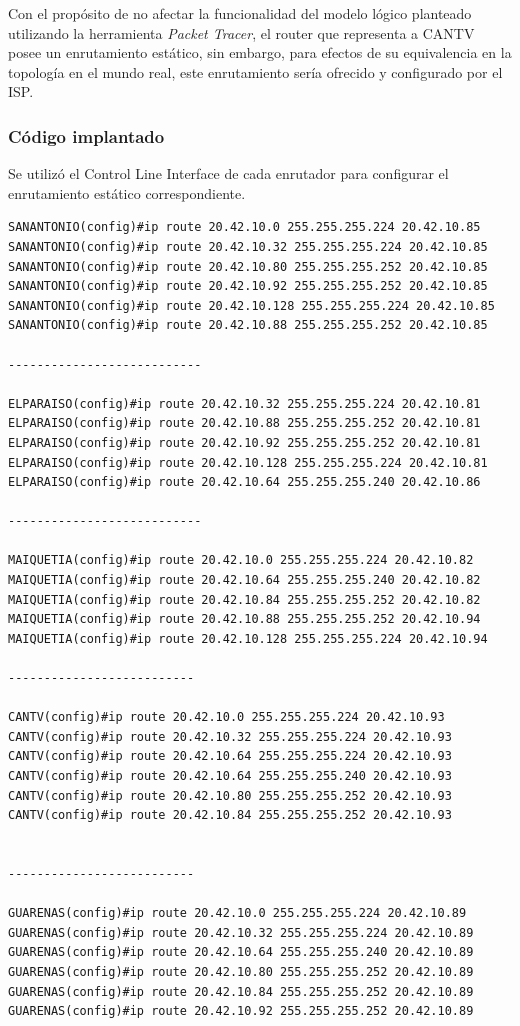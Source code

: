 \documentclass[]{article}
\begin{document}
Con el propósito de no afectar la funcionalidad del modelo lógico
planteado utilizando la herramienta \emph{Packet Tracer}, el router que
representa a CANTV posee un enrutamiento estático, sin embargo, para
efectos de su equivalencia en la topología en el mundo real, este
enrutamiento sería ofrecido y configurado por el ISP.

\subsubsection{Código implantado}\label{cuxf3digo-implantado}

Se utilizó el Control Line Interface de cada enrutador para configurar
el enrutamiento estático correspondiente.

\begin{verbatim}
SANANTONIO(config)#ip route 20.42.10.0 255.255.255.224 20.42.10.85
SANANTONIO(config)#ip route 20.42.10.32 255.255.255.224 20.42.10.85
SANANTONIO(config)#ip route 20.42.10.80 255.255.255.252 20.42.10.85
SANANTONIO(config)#ip route 20.42.10.92 255.255.255.252 20.42.10.85
SANANTONIO(config)#ip route 20.42.10.128 255.255.255.224 20.42.10.85
SANANTONIO(config)#ip route 20.42.10.88 255.255.255.252 20.42.10.85

---------------------------

ELPARAISO(config)#ip route 20.42.10.32 255.255.255.224 20.42.10.81
ELPARAISO(config)#ip route 20.42.10.88 255.255.255.252 20.42.10.81
ELPARAISO(config)#ip route 20.42.10.92 255.255.255.252 20.42.10.81
ELPARAISO(config)#ip route 20.42.10.128 255.255.255.224 20.42.10.81
ELPARAISO(config)#ip route 20.42.10.64 255.255.255.240 20.42.10.86

---------------------------

MAIQUETIA(config)#ip route 20.42.10.0 255.255.255.224 20.42.10.82
MAIQUETIA(config)#ip route 20.42.10.64 255.255.255.240 20.42.10.82
MAIQUETIA(config)#ip route 20.42.10.84 255.255.255.252 20.42.10.82
MAIQUETIA(config)#ip route 20.42.10.88 255.255.255.252 20.42.10.94
MAIQUETIA(config)#ip route 20.42.10.128 255.255.255.224 20.42.10.94

--------------------------

CANTV(config)#ip route 20.42.10.0 255.255.255.224 20.42.10.93
CANTV(config)#ip route 20.42.10.32 255.255.255.224 20.42.10.93
CANTV(config)#ip route 20.42.10.64 255.255.255.224 20.42.10.93
CANTV(config)#ip route 20.42.10.64 255.255.255.240 20.42.10.93
CANTV(config)#ip route 20.42.10.80 255.255.255.252 20.42.10.93
CANTV(config)#ip route 20.42.10.84 255.255.255.252 20.42.10.93


--------------------------

GUARENAS(config)#ip route 20.42.10.0 255.255.255.224 20.42.10.89
GUARENAS(config)#ip route 20.42.10.32 255.255.255.224 20.42.10.89
GUARENAS(config)#ip route 20.42.10.64 255.255.255.240 20.42.10.89
GUARENAS(config)#ip route 20.42.10.80 255.255.255.252 20.42.10.89
GUARENAS(config)#ip route 20.42.10.84 255.255.255.252 20.42.10.89
GUARENAS(config)#ip route 20.42.10.92 255.255.255.252 20.42.10.89
\end{verbatim}
\end{document}
